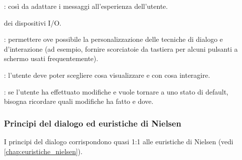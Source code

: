 : così da adattare i messaggi all'esperienza dell'utente.

 dei dispositivi I/O.

: permettere ove possibile la personalizzazione delle tecniche di dialogo e d'interazione (ad esempio, fornire scorciatoie da tastiera per alcuni pulsanti a schermo usati frequentemente).

: l'utente deve poter scegliere cosa visualizzare e con cosa interagire.

: se l'utente ha effettuato modifiche e vuole tornare a uno stato di default, bisogna ricordare quali modifiche ha fatto e dove.

\subsubsection{Principi del dialogo ed euristiche di Nielsen}

I principi del dialogo corrispondono quasi 1:1 alle euristiche di Nielsen (vedi \autoref{chap:euristiche_nielsen}).
